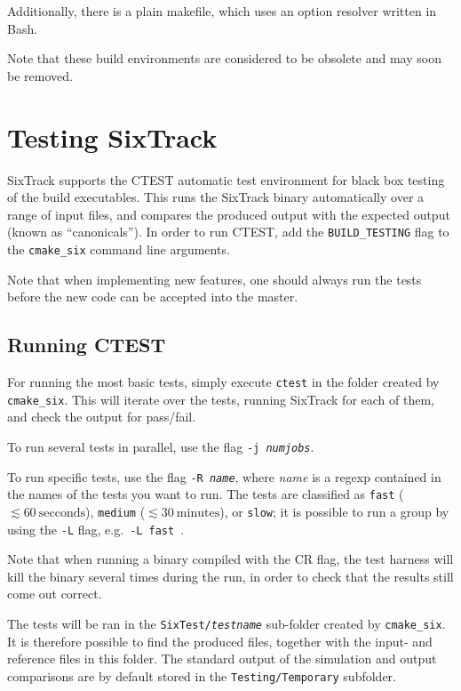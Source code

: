 \documentclass[english]{article}
\begin{document}
Additionally, there is a plain makefile, which uses an option resolver written in Bash.

Note that these build environments are considered to be obsolete and may soon be removed.

\section{Testing SixTrack}

SixTrack supports the CTEST automatic test environment for black box testing of the build executables.
This runs the SixTrack binary automatically over a range of input files, and compares the produced output with the expected output (known as ``canonicals'').
In order to run CTEST, add the \texttt{BUILD\_TESTING} flag to the \texttt{cmake\_six} command line arguments.

Note that when implementing new features, one should always run the tests before the new code can be accepted into the master.

\subsection{Running CTEST}
For running the most basic tests, simply execute \texttt{ctest} in the folder created by \texttt{cmake\_six}.
This will iterate over the tests, running SixTrack for each of them, and check the output for pass/fail.

To run several tests in parallel, use the flag \texttt{-j \textit{numjobs}}.

To run specific tests, use the flag \texttt{-R \textit{name}}, where \textit{name} is a regexp contained in the names of the tests you want to run.
The tests are classified as \texttt{fast} ($\lesssim 60~\mathrm{secconds}$), \texttt{medium} ($\lesssim 30~\mathrm{minutes}$), or \texttt{slow}; it is possible to run a group by using the \texttt{-L} flag, e.g.\ \texttt{-L fast}~.

Note that when running a binary compiled with the CR flag, the test harness will kill the binary several times during the run, in order to check that the results still come out correct.

The tests will be ran in the \texttt{SixTest/\textit{testname}} sub-folder created by \texttt{cmake\_six}.
It is therefore possible to find the produced files, together with the input- and reference files in this folder.
The standard output of the simulation and output comparisons are by default stored in the \texttt{Testing/Temporary} subfolder.
\end{document}
